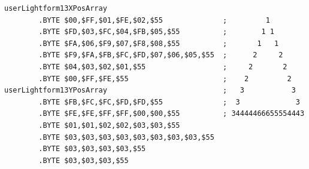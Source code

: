 \begin{minipage}[b]{0.48\linewidth}
\begin{lrbox}{\mybox}%
\begin{lstlisting}[basicstyle=\ttfamily\tiny,escapechar=\%]
userLightform13XPosArray
        .BYTE $00,$FF,$01,$FE,$02,$55              ;         1        
        .BYTE $FD,$03,$FC,$04,$FB,$05,$55          ;        1 1       
        .BYTE $FA,$06,$F9,$07,$F8,$08,$55          ;       1   1      
        .BYTE $F9,$FA,$FB,$FC,$FD,$07,$06,$05,$55  ;      2     2     
        .BYTE $04,$03,$02,$01,$55                  ;     2       2    
        .BYTE $00,$FF,$FE,$55                      ;    2         2   
userLightform13YPosArray                           ;   3           3  
        .BYTE $FB,$FC,$FC,$FD,$FD,$55              ;  3             3 
        .BYTE $FE,$FE,$FF,$FF,$00,$00,$55          ; 34444466655554443
        .BYTE $01,$01,$02,$02,$03,$03,$55
        .BYTE $03,$03,$03,$03,$03,$03,$03,$03,$55
        .BYTE $03,$03,$03,$03,$55
        .BYTE $03,$03,$03,$55
\end{lstlisting}
\end{lrbox}%
\scalebox{0.8}{\usebox{\mybox}}

\end{minipage}
%
%
